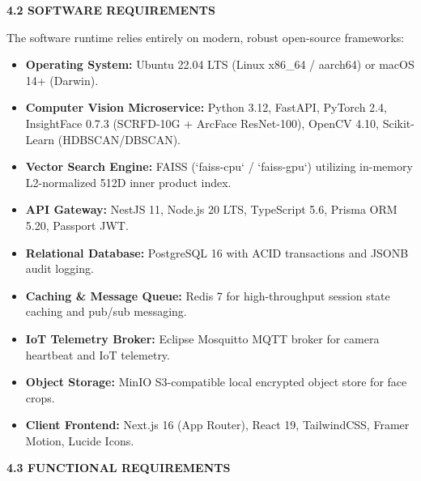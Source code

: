 \vspace{0.2in}
\begin{flushleft}
{\fontsize{14pt}{18pt}\selectfont \textbf{4.2 SOFTWARE REQUIREMENTS}}\\[2mm]
\end{flushleft}

\noindent The software runtime relies entirely on modern, robust open-source frameworks:
\begin{itemize}
    \item \textbf{Operating System:} Ubuntu 22.04 LTS (Linux x86\_64 / aarch64) or macOS 14+ (Darwin).
    \item \textbf{Computer Vision Microservice:} Python 3.12, FastAPI, PyTorch 2.4, InsightFace 0.7.3 (SCRFD-10G + ArcFace ResNet-100), OpenCV 4.10, Scikit-Learn (HDBSCAN/DBSCAN).
    \item \textbf{Vector Search Engine:} FAISS (`faiss-cpu` / `faiss-gpu`) utilizing in-memory L2-normalized 512D inner product index.
    \item \textbf{API Gateway:} NestJS 11, Node.js 20 LTS, TypeScript 5.6, Prisma ORM 5.20, Passport JWT.
    \item \textbf{Relational Database:} PostgreSQL 16 with ACID transactions and JSONB audit logging.
    \item \textbf{Caching \& Message Queue:} Redis 7 for high-throughput session state caching and pub/sub messaging.
    \item \textbf{IoT Telemetry Broker:} Eclipse Mosquitto MQTT broker for camera heartbeat and IoT telemetry.
    \item \textbf{Object Storage:} MinIO S3-compatible local encrypted object store for face crops.
    \item \textbf{Client Frontend:} Next.js 16 (App Router), React 19, TailwindCSS, Framer Motion, Lucide Icons.
\end{itemize}

\vspace{0.2in}
\begin{flushleft}
{\fontsize{14pt}{18pt}\selectfont \textbf{4.3 FUNCTIONAL REQUIREMENTS}}\\[2mm]
\end{flushleft}

